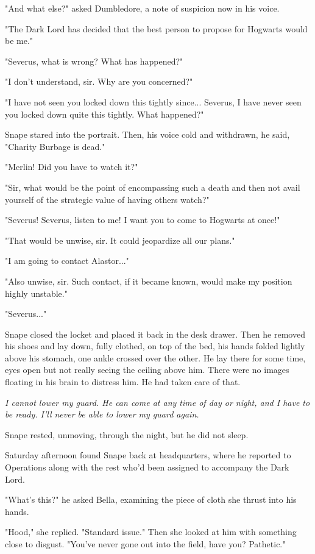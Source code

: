 "And what else?" asked Dumbledore, a note of suspicion now in his voice.

"The Dark Lord has decided that the best person to propose for Hogwarts would be me."

"Severus, what is wrong? What has happened?"

"I don't understand, sir. Why are you concerned?"

"I have not seen you locked down this tightly since... Severus, I have never seen you locked down quite this tightly. What happened?"

Snape stared into the portrait. Then, his voice cold and withdrawn, he said, "Charity Burbage is dead."

"Merlin! Did you have to watch it?"

"Sir, what would be the point of encompassing such a death and then not avail yourself of the strategic value of having others watch?"

"Severus! Severus, listen to me! I want you to come to Hogwarts at once!"

"That would be unwise, sir. It could jeopardize all our plans."

"I am going to contact Alastor..."

"Also unwise, sir. Such contact, if it became known, would make my position highly unstable."

"Severus..."

Snape closed the locket and placed it back in the desk drawer. Then he removed his shoes and lay down, fully clothed, on top of the bed, his hands folded lightly above his stomach, one ankle crossed over the other. He lay there for some time, eyes open but not really seeing the ceiling above him. There were no images floating in his brain to distress him. He had taken care of that.

\emph{I cannot lower my guard. He can come at any time of day or night, and I have to be ready. I'll never be able to lower my guard again.}

Snape rested, unmoving, through the night, but he did not sleep.

Saturday afternoon found Snape back at headquarters, where he reported to Operations along with the rest who'd been assigned to accompany the Dark Lord.

"What's this?" he asked Bella, examining the piece of cloth she thrust into his hands.

"Hood," she replied. "Standard issue." Then she looked at him with something close to disgust. "You've never gone out into the field, have you? Pathetic."

